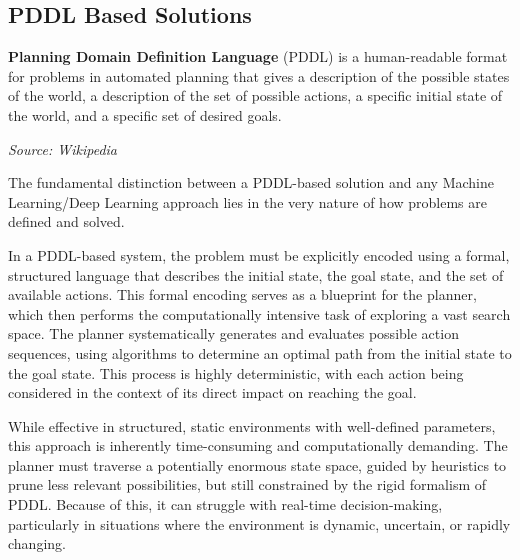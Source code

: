 
\subsection{PDDL Based Solutions}
\label{sub:pddl_based_solutions}
\begin{blockquote}
  \textbf{Planning Domain Definition Language} (PDDL) is a human-readable format
  for problems in automated planning that gives a description of the possible
  states of the world, a description of the set of possible actions, a specific
  initial state of the world, and a specific set of desired goals.

  \emph{Source: Wikipedia\footnotemark}
\end{blockquote}

The fundamental distinction between a PDDL-based solution and any Machine Learning/Deep
Learning approach lies in the very nature of how problems are defined and solved.

In a PDDL-based system, the problem must be explicitly encoded using a formal, structured
language that describes the initial state, the goal state, and the set of available
actions. This formal encoding serves as a blueprint for the planner, which then performs
the computationally intensive task of exploring a vast search space. The planner
systematically generates and evaluates possible action sequences, using algorithms
to determine an optimal path from the initial state to the goal state. This
process is highly deterministic, with each action being considered in the context
of its direct impact on reaching the goal.

While effective in structured, static environments with well-defined parameters,
this approach is inherently time-consuming and computationally demanding. The
planner must traverse a potentially enormous state space, guided by heuristics to
prune less relevant possibilities, but still constrained by the rigid formalism
of PDDL. Because of this, it can struggle with real-time decision-making, particularly
in situations where the environment is dynamic, uncertain, or rapidly changing.

